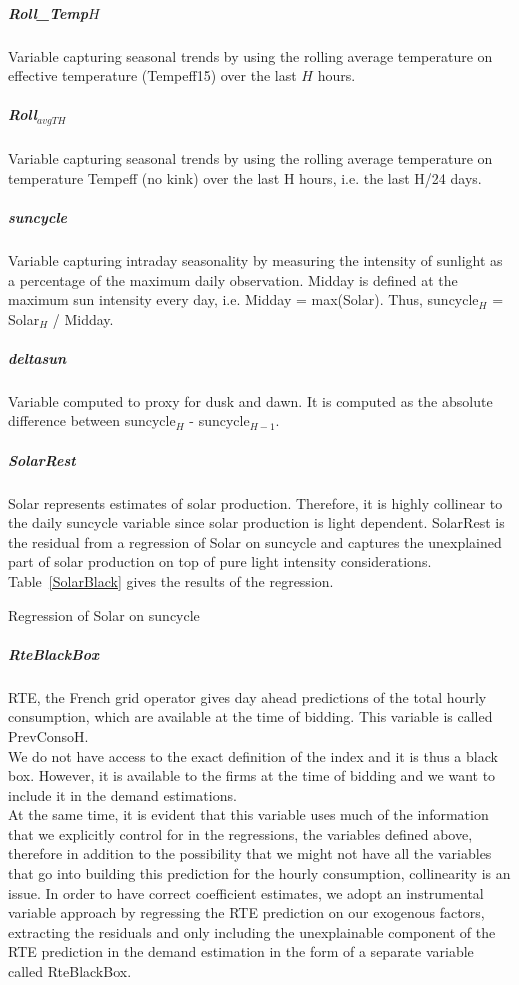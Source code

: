 \subparagraph{Roll\_Temp$H$}
\label{rolltemp720}
Variable capturing seasonal trends by using the rolling average temperature on effective temperature (Tempeff15) over the last $H$ hours.

\subparagraph{Roll$_{avgTH}$} Variable capturing seasonal trends by using the rolling average temperature on temperature Tempeff (no kink) over the last H hours, i.e. the last H/24 days.

\subparagraph{suncycle}\label{suncycle} Variable capturing intraday seasonality by measuring the intensity of sunlight as a percentage of the maximum daily observation. Midday is defined at the maximum sun intensity every day, i.e. Midday = max(Solar). Thus, suncycle$_H$ = Solar$_H$ / Midday.

\subparagraph{deltasun}\label{deltasun} Variable computed to proxy for dusk and dawn. It is computed as the absolute difference between suncycle$_H$ - suncycle$_{H−1}$.

\subparagraph{SolarRest}
\label{SolarRest}
Solar represents estimates of solar production. Therefore, it is highly collinear to the daily suncycle variable since solar production is light dependent. %
SolarRest is the residual from a regression of Solar on suncycle %
and captures the unexplained part of solar production on top of pure light intensity considerations. Table~\ref{SolarBlack} gives the results of the regression.
\begin{table}[H]

\caption{\label{SolarBlack} Regression of Solar on suncycle}
\end{table}

\subparagraph{RteBlackBox}
\label{RteBlackBox}
RTE, the French grid operator gives day ahead predictions of the total hourly consumption, which are available at the time of bidding. This variable is called PrevConsoH. \\

We do not have access to the exact definition of the index and it is thus a black box. However, it is available to the firms at the time of bidding and we want to include it in the demand estimations. \\

At the same time, it is evident that this variable uses much of the information that we explicitly control for in the regressions, the variables defined above, therefore in addition to the possibility that we might not have all the variables that go into building this prediction for the hourly consumption, collinearity is an issue. In order to have correct coefficient estimates, we adopt an instrumental variable approach by regressing the RTE prediction on our exogenous factors, extracting the residuals and only including the unexplainable component of the RTE prediction in the demand estimation in the form of a separate variable called RteBlackBox.\\

